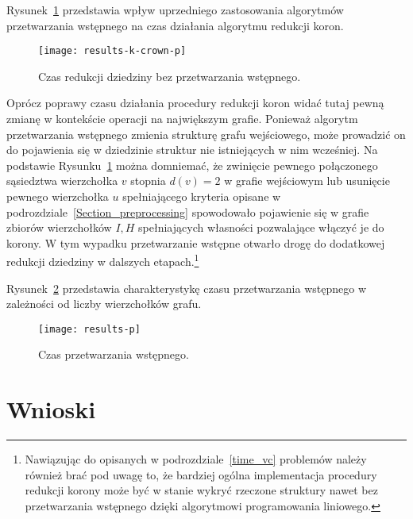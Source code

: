 \par{
  Rysunek~\ref{fig_results_k_crown_p} przedstawia wpływ uprzedniego zastosowania algorytmów przetwarzania wstępnego na czas działania algorytmu redukcji koron.
  \begin{figure}
    \caption{Czas redukcji dziedziny bez przetwarzania wstępnego.}
    \label{fig_results_k_crown_p}
    \centering
      \texttt{[image: results-k-crown-p]}
  \end{figure}
  Oprócz poprawy czasu działania procedury redukcji koron widać tutaj pewną zmianę w kontekście operacji na największym grafie.
  Ponieważ algorytm przetwarzania wstępnego zmienia strukturę grafu wejściowego, może prowadzić on do pojawienia się w dziedzinie struktur nie istniejących w nim wcześniej.
  Na podstawie Rysunku~\ref{fig_results_k_crown_p} można domniemać, że zwinięcie pewnego połączonego sąsiedztwa wierzchołka $v$ stopnia $d(v)=2$ w grafie wejściowym lub usunięcie pewnego wierzchołka $u$ spełniającego kryteria opisane w podrozdziale~\ref{Section_preprocessing} spowodowało pojawienie się w grafie zbiorów wierzchołków $I, H$ spełniających własności pozwalające włączyć je do korony.
  W tym wypadku przetwarzanie wstępne otwarło drogę do dodatkowej redukcji dziedziny w dalszych etapach.\footnote{Nawiązując do opisanych w podrozdziale~\ref{time_vc} problemów należy również brać pod uwagę to, że bardziej ogólna implementacja procedury redukcji korony może być w stanie wykryć rzeczone struktury nawet bez przetwarzania wstępnego dzięki algorytmowi programowania liniowego.}
}
\par{
  Rysunek~\ref{fig_results_p} przedstawia charakterystykę czasu przetwarzania wstępnego w zależności od liczby wierzchołków grafu.
  \begin{figure}
    \caption{Czas przetwarzania wstępnego.}
    \label{fig_results_p}
    \centering
      \texttt{[image: results-p]}
  \end{figure}
}
\section{Wnioski}

